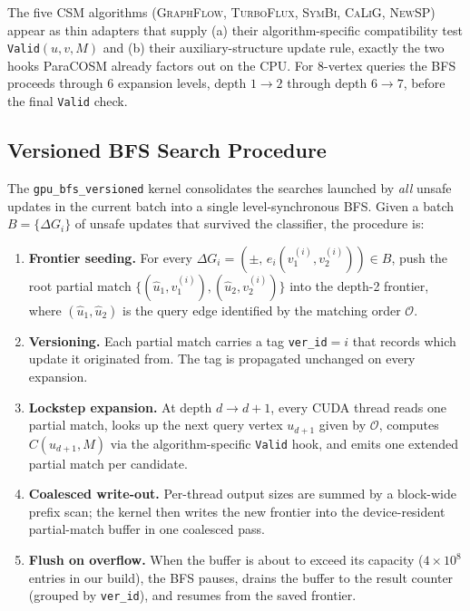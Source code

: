 \documentclass[sigconf,nonacm]{acmart}
\theoremstyle{definition}
\begin{document}
The five CSM algorithms (\textsc{GraphFlow}, \textsc{TurboFlux}, \textsc{SymBi}, \textsc{CaLiG}, \textsc{NewSP}) appear as thin adapters that supply (a) their algorithm-specific compatibility test \texttt{Valid}$(u,v,M)$ and (b) their auxiliary-structure update rule, exactly the two hooks ParaCOSM already factors out on the CPU. For 8-vertex queries the BFS proceeds through 6 expansion levels, depth $1{\to}2$ through depth $6{\to}7$, before the final \texttt{Valid} check.

\subsection{Versioned BFS Search Procedure}
\label{sec:versioned}
The \texttt{gpu\_bfs\_versioned} kernel consolidates the searches launched by \emph{all} unsafe updates in the current batch into a single level-synchronous BFS. Given a batch $B=\{\Delta G_i\}$ of unsafe updates that survived the classifier, the procedure is:

\begin{enumerate}
  \item \textbf{Frontier seeding.} For every $\Delta G_i=(\pm,\,e_i(v_1^{(i)},v_2^{(i)}))\in B$, push the root partial match $\{(\hat u_1,v_1^{(i)}),(\hat u_2,v_2^{(i)})\}$ into the depth-2 frontier, where $(\hat u_1,\hat u_2)$ is the query edge identified by the matching order $\mathcal{O}$.
  \item \textbf{Versioning.} Each partial match carries a tag \texttt{ver\_id}$=i$ that records which update it originated from. The tag is propagated unchanged on every expansion.
  \item \textbf{Lockstep expansion.} At depth $d{\to}d{+}1$, every CUDA thread reads one partial match, looks up the next query vertex $u_{d+1}$ given by $\mathcal{O}$, computes $C(u_{d+1},M)$ via the algorithm-specific \texttt{Valid} hook, and emits one extended partial match per candidate.
  \item \textbf{Coalesced write-out.} Per-thread output sizes are summed by a block-wide prefix scan; the kernel then writes the new frontier into the device-resident partial-match buffer in one coalesced pass.
  \item \textbf{Flush on overflow.} When the buffer is about to exceed its capacity ($4\times10^8$ entries in our build), the BFS pauses, drains the buffer to the result counter (grouped by \texttt{ver\_id}), and resumes from the saved frontier.
\end{enumerate}
\end{document}
